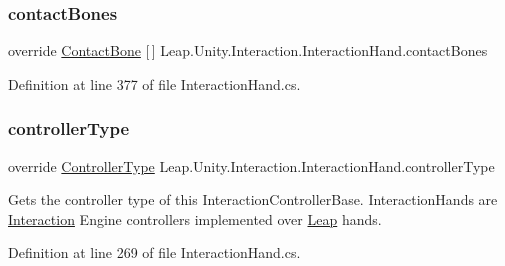 \subsubsection{\texorpdfstring{contactBones}{contactBones}}
{\footnotesize\ttfamily override \mbox{\hyperlink{class_leap_1_1_unity_1_1_interaction_1_1_contact_bone}{Contact\+Bone}} \mbox{[}$\,$\mbox{]} Leap.\+Unity.\+Interaction.\+Interaction\+Hand.\+contact\+Bones\hspace{0.3cm}{\ttfamily [get]}}



Definition at line 377 of file Interaction\+Hand.\+cs.

\mbox{\label{class_leap_1_1_unity_1_1_interaction_1_1_interaction_hand_af21b7c107fc75a75a362679d4471fa6a}} 
\subsubsection{\texorpdfstring{controllerType}{controllerType}}
{\footnotesize\ttfamily override \mbox{\hyperlink{namespace_leap_1_1_unity_1_1_interaction_a9752eb3e2905e8ebd134fff20c155e6b}{Controller\+Type}} Leap.\+Unity.\+Interaction.\+Interaction\+Hand.\+controller\+Type\hspace{0.3cm}{\ttfamily [get]}}



Gets the controller type of this Interaction\+Controller\+Base. Interaction\+Hands are \mbox{\hyperlink{namespace_leap_1_1_unity_1_1_interaction}{Interaction}} Engine controllers implemented over \mbox{\hyperlink{namespace_leap_1_1_unity_1_1_leap}{Leap}} hands. 



Definition at line 269 of file Interaction\+Hand.\+cs.

\mbox{\label{class_leap_1_1_unity_1_1_interaction_1_1_interaction_hand_aeb1b0a92a1d62de094c6207a7edbd3e4}} 
